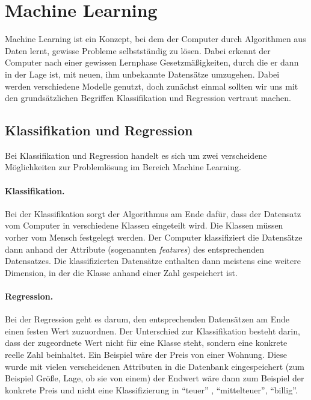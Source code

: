 \section{Machine Learning}
\author{Farhadiba Mohammed, Dennis Kempf, David Steinmann}
Machine Learning ist ein Konzept, bei dem der Computer durch Algorithmen aus Daten lernt, gewisse Probleme selbstständig zu lösen. Dabei erkennt der Computer nach einer gewissen Lernphase Gesetzmä\ss igkeiten, durch die er dann in der Lage ist, mit neuen, ihm unbekannte Datensätze umzugehen. Dabei werden verschiedene Modelle genutzt, doch zunächst einmal sollten wir uns mit den grundsätzlichen Begriffen Klassifikation und Regression vertraut machen.

\subsection{Klassifikation und Regression}
\author{David Steinmann}
Bei Klassifikation und Regression handelt es sich um zwei verscheidene Möglichkeiten zur Problemlösung im Bereich Machine Learning.

\paragraph{Klassifikation.}
Bei der Klassifikation sorgt der Algorithmus am Ende dafür, dass der Datensatz vom Computer in verschiedene Klassen eingeteilt wird. Die Klassen müssen vorher vom Mensch festgelegt werden. Der Computer klassifiziert die Datensätze dann anhand der Attribute (sogenannten \emph{features}) des entsprechenden Datensatzes. Die klassifizierten Datensätze enthalten dann meistens eine weitere Dimension, in der die Klasse anhand einer Zahl gespeichert ist.

\paragraph{Regression.}
Bei der Regression geht es darum, den entsprechenden Datensätzen am Ende einen festen Wert zuzuordnen. Der Unterschied zur Klassifikation besteht darin, dass der zugeordnete Wert nicht für eine Klasse steht, sondern eine konkrete reelle Zahl beinhaltet. Ein Beispiel wäre der Preis von einer Wohnung. Diese wurde mit vielen verscheidenen Attributen in die Datenbank eingespeichert (zum Beispiel Größe, Lage, ob sie von einem) der Endwert wäre dann zum Beispiel der konkrete Preis und nicht eine Klassifizierung in \enquote{teuer} , \enquote{mittelteuer}, \enquote{billig}. 

